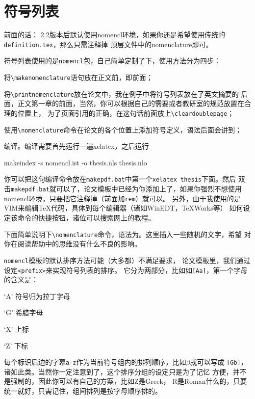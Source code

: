 \section{符号列表}

{\hei 前面的话：}{\kai\color{blue} 
2.2版本后默认使用nomencl环境，如果你还是希望使用传统的\verb|definition.tex|，那么只需注释掉
顶层文件中的nomenclature即可。}

符号列表使用的是\verb|nomencl|包，自己简单定制了下，使用方法分为四步：
\begin{compactenum}
\item 将\verb|\makenomenclature|语句放在正文前，即\verb||前面；
\item 将\verb|\printnomenclature|放在论文中，我在例子中将符号列表放在了英文摘要的
后面，正文第一章的前面，当然，你可以根据自己的需要或者教研室的规范放置在合理的位置上，
为了页面引用的正确，在这句话前面放上\verb|\cleardoublepage|；
\item 使用\verb|\nomenclature|命令在论文的各个位置上添加符号定义，语法后面会讲到；
\item 编译。编译需要首先运行一遍xelatex，之后运行
\begin{code}
makeindex -s nomencl.ist -o thesis.nls thesis.nlo
\end{code}
\end{compactenum}

你可以把这句编译命令放在\verb|makepdf.bat|中第一个\verb|xelatex thesis|下面。然后
双击\verb|makepdf.bat|就可以了，论文模板中已经为你添加上了，如果你强烈不想使用
nomencl环境，只要把它注释掉（前面加\verb|rem|）就可以。
另外，由于我使用的是VIM来编辑\TeX{}代码，具体到每个编辑器（诸如WinEDT，TeXWorks等）
如何设定该命令的快捷按钮，诸位可以搜索网上的教程。

下面简单说明下\verb|\nomenclature|命令，语法为。这里插入一些随机的文字，希望
对你在阅读帮助中的思维没有什么不良的影响。
\begin{code}
\end{code}
\verb|nomencl|模板的默认排序方法可能（大多都）不满足要求，
论文模板里，我们通过设定\verb|<prefix>|来实现符号列表的排序。
它分为两部分，比如如\verb|[Aa]|，第一个字母的含义是：
\begin{compactitem}
\item[`A'] 符号归为拉丁字母
\item[`G'] 希腊字母
\item[`X'] 上标
\item[`Z'] 下标
\end{compactitem}
每个标识后边的字幕\verb|a-z|作为当前符号组内的排列顺序，比如$\beta$就可以写成
\verb|[Gb]|，诸如此类。当然你一定注意到了，这个排序分组的设定只是为了记忆
方便，并不是强制的，因此你可以有自己的方案，比如Z是Greek，
R是Roman什么的，只要统一就好，只需记住，组间排列是按字母顺序排的。

